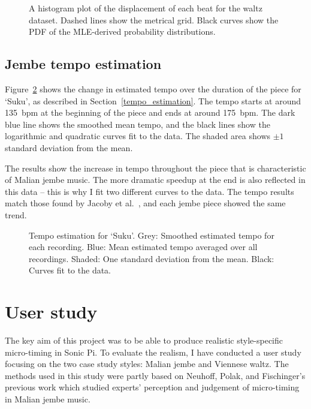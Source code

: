 \documentclass[12pt,twoside,openright]{report}
\begin{document}
\begin{figure}[ht]
    \centering
    
    \caption{A histogram plot of the displacement of each beat for the waltz dataset. Dashed lines show the metrical grid. Black curves show the PDF of the MLE-derived probability distributions.}
    \label{fig:waltz_histogram}
\end{figure}


\subsection{Jembe tempo estimation} \label{jembe_tempo_estimation_results}

Figure~\ref{fig:suku_tempo} shows the change in estimated tempo over the duration of the piece for
`Suku', as described in Section~\ref{tempo_estimation}. The tempo starts at around 135~bpm at the beginning of the piece and
ends at around 175~bpm. The dark blue line shows the smoothed mean tempo, and
the black lines show the logarithmic and quadratic curves fit to the data. The
shaded area shows $\pm1$ standard deviation from the mean.

The results show the increase in tempo throughout the piece that is characteristic of Malian jembe music. The more dramatic speedup at the end is also reflected in this data -- this is why I fit two different curves to the data. The tempo results match those found by Jacoby et al.\ \cite{jacoby2021supp}, and each jembe piece showed the same trend.

\begin{figure}[ht]
    \centering
    
    \caption{Tempo estimation for `Suku'. Grey: Smoothed estimated tempo for each recording. Blue: Mean estimated tempo averaged over all recordings. Shaded: One standard deviation from the mean. Black: Curves fit to the data.}
    \label{fig:suku_tempo}
\end{figure}



\section{User study} \label{user_study}

The key aim of this project was to be able to produce realistic style-specific
micro-timing in Sonic Pi. To evaluate the realism, I have conducted a user study
focusing on the two case study styles: Malian jembe and Viennese waltz. The
methods used in this study were partly based on Neuhoff, Polak, and Fischinger's
previous work \cite{neuhoff2017} which studied experts' perception and judgement of
micro-timing in Malian jembe music.
\end{document}
